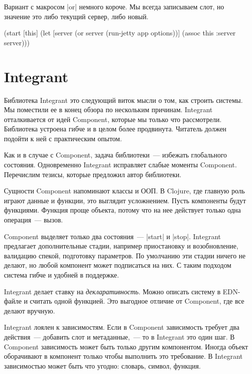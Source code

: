 Вариант с макросом \spverb|or| немного короче. Мы всегда записываем слот, но
значение это либо текущий сервер, либо новый.

\begin{english}
  \begin{clojure}
(start [this]
  (let [server (or server (run-jetty app options))]
    (assoc this :server server)))
  \end{clojure}
\end{english}

\section{Integrant}

Библиотека Integrant
это следующий виток мысли о том, как строить системы. Мы поместили ее в конец
обзора по нескольким причинам. Integrant отталкивается от идей
Component, которые мы только что рассмотрели. Библиотека устроена гибче
и в целом более продвинута. Читатель должен подойти к ней с практическим опытом.

Как и в случае с Component, задача библиотеки~--- избежать глобального
состояния. Одновременно Integrant исправляет слабые моменты
Component. Перечислим тезисы, которые предложил автор библиотеки.

Сущности Component напоминают классы и ООП. В Clojure, где главную роль
играют данные и функции, это выглядит усложнением. Пусть компоненты будут
функциями. Функция проще объекта, потому что на нее действует только одна
операция~--- вызов.

Component выделяет только два состояния~--- \spverb|start| и
\spverb|stop|. Integrant предлагает дополнительные стадии, например
приостановку и возобновление, валидацию спекой, подготовку параметров. По
умолчанию эти стадии ничего не делают, но любой компонент может подписаться на
них. С таким подходом система гибче и удобней в поддержке.

Integrant делает ставку на \emph{декларативность}. Можно описать
систему в EDN-файле и считать одной функцией. Это выгодное отличие от
Component, где все делают вручную.

Integrant лоялен к зависимостям. Если в Component зависимость
требует два действия~--- добавить слот и метаданные,~--- то в Integrant
это один шаг. В Component зависимость может быть только другим
компонентом. Иногда объект оборачивают в компонент только чтобы выполнить это
требование. В Integrant зависимостью может быть что угодно: словарь,
символ, функция.


